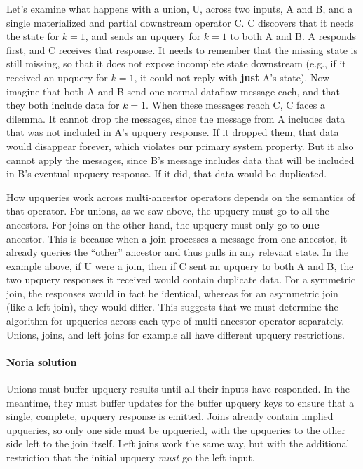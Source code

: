 \documentclass[12pt,letterpaper,twoside]{article}
\begin{document}
Let's examine what happens with a union, U, across two inputs, A and B,
and a single materialized and partial downstream operator C. C discovers
that it needs the state for $k = 1$, and sends an upquery for $k = 1$ to
both A and B. A responds first, and C receives that response. It needs
to remember that the missing state is still missing, so that it does not
expose incomplete state downstream (e.g., if it received an upquery for
$k = 1$, it could not reply with \textbf{just} A's state). Now imagine that
both A and B send one normal dataflow message each, and that they both
include data for $k = 1$. When these messages reach C, C faces a
dilemma. It cannot drop the messages, since the message from A includes
data that was not included in A's upquery response. If it dropped them,
that data would disappear forever, which violates our primary system
property. But it also cannot apply the messages, since B's message
includes data that will be included in B's eventual upquery response. If
it did, that data would be duplicated.

How upqueries work across multi-ancestor operators depends on the
semantics of that operator. For unions, as we saw above, the upquery
must go to all the ancestors. For joins on the other hand, the upquery
must only go to \textbf{one} ancestor. This is because when a join processes
a message from one ancestor, it already queries the ``other'' ancestor and
thus pulls in any relevant state. In the example above, if U were a
join, then if C sent an upquery to both A and B, the two upquery
responses it received would contain duplicate data. For a symmetric
join, the responses would in fact be identical, whereas for an
asymmetric join (like a left join), they would differ. This suggests
that we must determine the algorithm for upqueries across each type of
multi-ancestor operator separately. Unions, joins, and left joins for
example all have different upquery restrictions.

\paragraph{Noria solution}
Unions must buffer upquery results until all their inputs have responded. In the
meantime, they must buffer updates for the buffer upquery keys to ensure that a
single, complete, upquery response is emitted. Joins already contain implied
upqueries, so only one side must be upqueried, with the upqueries to the other
side left to the join itself. Left joins work the same way, but with the
additional restriction that the initial upquery \emph{must} go the left input.
\end{document}
